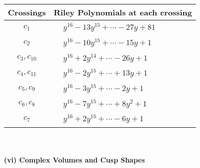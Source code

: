 \documentclass[1p]{elsarticle_modified}
\theoremstyle{definition}
\begin{document}
\begin{tabular}{m{50pt}|m{274pt}}
Crossings & \hspace{64pt}Riley Polynomials at each crossing \\
\hline $$\begin{aligned}c_{1}\end{aligned}$$&$\begin{aligned}
&y^{16}-13 y^{15}+\cdots-27 y+81
\end{aligned}$\\
\hline $$\begin{aligned}c_{2}\end{aligned}$$&$\begin{aligned}
&y^{16}-10 y^{15}+\cdots-15 y+1
\end{aligned}$\\
\hline $$\begin{aligned}c_{3},c_{10}\end{aligned}$$&$\begin{aligned}
&y^{16}+2 y^{14}+\cdots-26 y+1
\end{aligned}$\\
\hline $$\begin{aligned}c_{4},c_{11}\end{aligned}$$&$\begin{aligned}
&y^{16}-2 y^{15}+\cdots+13 y+1
\end{aligned}$\\
\hline $$\begin{aligned}c_{5},c_{9}\end{aligned}$$&$\begin{aligned}
&y^{16}-3 y^{15}+\cdots-2 y+1
\end{aligned}$\\
\hline $$\begin{aligned}c_{6},c_{8}\end{aligned}$$&$\begin{aligned}
&y^{16}-7 y^{15}+\cdots+8 y^2+1
\end{aligned}$\\
\hline $$\begin{aligned}c_{7}\end{aligned}$$&$\begin{aligned}
&y^{16}+2 y^{15}+\cdots-6 y+1
\end{aligned}$\\
\hline
\end{tabular}\\~\\
\newpage\flushleft \textbf{(vi) Complex Volumes and Cusp Shapes}
\end{document}
